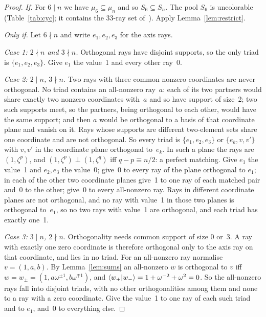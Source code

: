 \begin{proof}
\emph{If.}  For $6\mid n$ we have $\mu_6\subseteq\mu_n$ and so $S_6\subseteq S_n$.  The pool
$S_6$ is uncolorable (Table~\ref{tab:cyc}; it contains the 33-ray set
of~\cite{Cabello2025simplest}).  Apply Lemma~\ref{lem:restrict}.

\emph{Only if.}  Let $6\nmid n$ and write $e_1,e_2,e_3$ for the axis rays.

\emph{Case 1: $2\nmid n$ and $3\nmid n$.}  Orthogonal rays have disjoint supports, so the only
triad is $\{e_1,e_2,e_3\}$.  Give $e_1$ the value~1 and every other ray~0.

\emph{Case 2: $2\mid n$, $3\nmid n$.}  Two rays with three common nonzero coordinates are never
orthogonal.  No triad contains an all-nonzero ray~$a$: each of its two partners would share
exactly two nonzero coordinates with~$a$ and so have support of size~2; two such supports meet,
so the partners, being orthogonal to each other, would have the same support; and then $a$ would
be orthogonal to a basis of that coordinate plane and vanish on it.  Rays whose supports are
different two-element sets share one coordinate and are not orthogonal.  So every triad is
$\{e_1,e_2,e_3\}$ or $\{e_k,v,v'\}$ with $v,v'$ in the coordinate plane orthogonal to~$e_k$.  In
such a plane the rays are $(1,\zeta^p)$, and $(1,\zeta^p)\perp(1,\zeta^q)$ iff $q-p\equiv n/2$: a
perfect matching.  Give $e_1$ the value~1 and $e_2,e_3$ the value~0; give~0 to every ray of the
plane orthogonal to $e_1$; in each of the other two coordinate planes give~1 to one ray of each
matched pair and~0 to the other; give~0 to every all-nonzero ray.  Rays in different coordinate
planes are not orthogonal, and no ray with value~1 in those two planes is orthogonal to~$e_1$, so
no two rays with value~1 are orthogonal, and each triad has exactly one~1.

\emph{Case 3: $3\mid n$, $2\nmid n$.}  Orthogonality needs common support of size 0 or~3.  A ray
with exactly one zero coordinate is therefore orthogonal only to the axis ray on that coordinate,
and lies in no triad.  For an all-nonzero ray normalise $v=(1,a,b)$.  By Lemma~\ref{lem:sums} an
all-nonzero $w$ is orthogonal to $v$ iff $w=w_{\pm}=(1,a\omega^{\pm1},b\omega^{\mp1})$, and
$\langle w_+|w_-\rangle=1+\omega^{-2}+\omega^{2}=0$.  So the all-nonzero rays fall into disjoint
triads, with no other orthogonalities among them and none to a ray with a zero coordinate.  Give
the value~1 to one ray of each such triad and to $e_1$, and~0 to everything else.
\end{proof}

